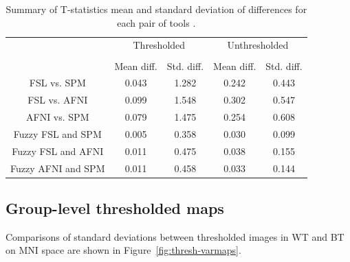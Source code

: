 \documentclass[conference]{IEEEtran}
\begin{document}
\setlength{\tabcolsep}{5pt}
\begin{table}[h]
    \centering
    \begin{tabular}{ccc|cc}
        \toprule
        \multirow{2}{*}{} & \multicolumn{2}{c}{Thresholded} & \multicolumn{2}{c}{Unthresholded} \\
        \cmidrule{2-3} \cmidrule{4-5} \\
        {} & Mean diff. & Std. diff. & Mean diff. & Std. diff. \\
        \midrule
        \rowcolor{lightgray}
        FSL vs. SPM          &  0.043       & 1.282      & 0.242     & 0.443  \\
        \rowcolor{lightgray}
        FSL vs. AFNI         &  0.099       & 1.548      & 0.302     & 0.547  \\
        \rowcolor{lightgray}
        AFNI vs. SPM         &  0.079       & 1.475      & 0.254     & 0.608  \\
        Fuzzy FSL and SPM    &  0.005       & 0.358      & 0.030     & 0.099  \\
        Fuzzy FSL and AFNI   &  0.011       & 0.475      & 0.038     & 0.155  \\
        Fuzzy AFNI and SPM   &  0.011       & 0.458      & 0.033     & 0.144  \\
        \bottomrule
    \end{tabular}
    \caption{Summary of T-statistics mean and standard deviation of differences for each pair of tools .}
    \label{table:pipeline-stats}
\end{table}


\subsection{Group-level thresholded maps}

Comparisons of standard deviations between thresholded images in WT and BT
on MNI space are shown in Figure~\ref{fig:thresh-varmaps}.
\end{document}

